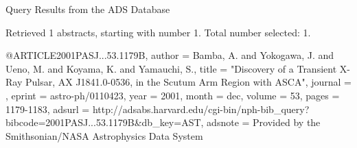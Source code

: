 Query Results from the ADS Database


Retrieved 1 abstracts, starting with number 1.  Total number selected: 1.

@ARTICLE{2001PASJ...53.1179B,
   author = {{Bamba}, A. and {Yokogawa}, J. and {Ueno}, M. and {Koyama}, K. and 
	{Yamauchi}, S.},
    title = "{Discovery of a Transient X-Ray Pulsar, AX J1841.0-0536, in the Scutum Arm Region with ASCA}",
  journal = {\pasj},
   eprint = {astro-ph/0110423},
     year = 2001,
    month = dec,
   volume = 53,
    pages = {1179-1183},
   adsurl = {http://adsabs.harvard.edu/cgi-bin/nph-bib_query?bibcode=2001PASJ...53.1179B&db_key=AST},
  adsnote = {Provided by the Smithsonian/NASA Astrophysics Data System}
}


